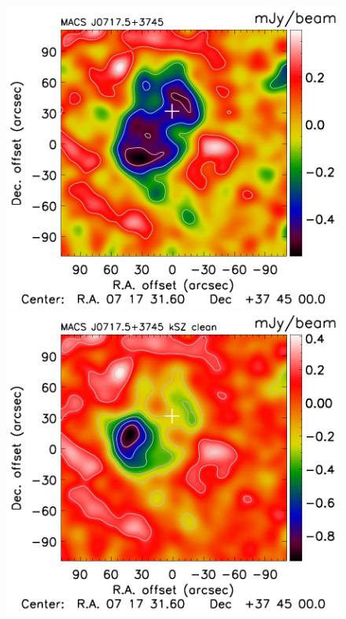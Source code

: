 \documentclass[twocolumn,traditabstract]{aa}
\begin{document}
\begin{figure}[h]
\includegraphics[trim=0cm 0cm 0cm 0cm, clip=true, totalheight=3.8cm]{Figure/DoG_MACSJ0717_15_15_45.pdf}
\includegraphics[trim=0cm 0cm 0cm 0cm, clip=true, totalheight=3.8cm]{Figure/DoG_MACSJ0717kSZ_15_15_45.pdf}

\end{figure}
\end{document}
